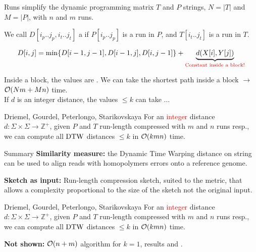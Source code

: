 \begin{frame}{Runs simplify the dynamic programming matrix}
    $T$ and $P$ strings, $N=|T|$ and $M=|P|$, with $n$ and $m$ runs. \pause
    \smallskip

    We call $D[i_p .. j_p, i_t .. j_t]$ a  if $P[i_p.. j_p]$ is a run in $P$, and $T[i_t .. j_t]$ is a run in $T$.
    
    
    {
    \[
        D[i,j] = {\min\{D[i-1,j-1],D[i-1,j],D[i,j-1]\}
        + \underbrace{d(X[i], Y[j])}_\text{\textcolor{red}{Constant inside a block!}}}
    \]
    }
            
    Inside a block, the values are .
    We can take the shortest path inside a block $\rightarrow$ $\mathcal{O}(Nm+Mn)$ time.\\
    If $d$ is an integer distance, the values $\leq k$ can take ...
    
    \begin{myalertblock}{Driemel, Gourdel, Peterlongo, Starikovskaya}
        For an \textcolor{red}{integer} distance $d: \Sigma \times \Sigma \rightarrow \mathbb{Z}^+$, given $P$ and $T$ run-length compressed with $m$ and $n$ runs resp.,
        we can compute all $\mathrm{DTW}$ distances $\leq k$ in $\mathcal{O}(k mn)$ time.
    \end{myalertblock}
    \end{frame}

\begin{frame}{Summary}
    \textbf{Similarity measure:} the Dynamic Time Warping distance on string can be used to align reads with homopolymers errors onto a reference genome.

    \vfill
    
    \textbf{Sketch as input:} Run-length compression sketch, suited to the metric, that allows a complexity proportional to the size of the sketch not the original input.
    
    \vfill
    \begin{myalertblock}{Driemel, Gourdel, Peterlongo, Starikovskaya}
        For an \textcolor{red}{integer} distance $d: \Sigma \times \Sigma \rightarrow \mathbb{Z}^+$, given $P$ and $T$ run-length compressed with $m$ and $n$ runs resp.,
        we can compute all $\mathrm{DTW}$ distances $\leq k$ in $\mathcal{O}(k mn)$ time.
    \end{myalertblock}
    \vfill
    \textbf{Not shown:} $\mathcal{O}(n+m)$ algorithm for $k=1$,   results and .
\end{frame}
    